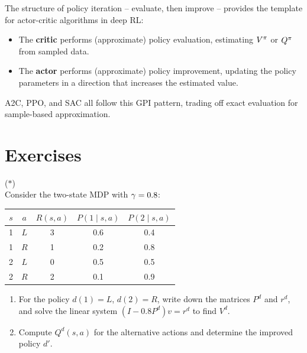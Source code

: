 \documentclass[11pt,a4paper]{article}
\begin{document}
\begin{rlconnection}[title={PI as the Blueprint for Actor-Critic}]
The structure of policy iteration -- evaluate, then improve --
provides the template for actor-critic algorithms in deep RL:
\begin{itemize}[nosep]
    \item The \textbf{critic} performs (approximate) policy
    evaluation, estimating $V^\pi$ or $Q^\pi$ from sampled
    data.
    \item The \textbf{actor} performs (approximate) policy
    improvement, updating the policy parameters in a direction
    that increases the estimated value.
\end{itemize}
A2C, PPO, and SAC all follow this GPI pattern, trading off exact
evaluation for sample-based approximation.
\end{rlconnection}


\section{Exercises}
\label{sec:exercises}

\begin{exercise}
\textnormal{(\(*\))} \\
Consider the two-state MDP with $\gamma = 0.8$:
\begin{center}
\begin{tabular}{ccccc}
\toprule
$s$ & $a$ & $R(s,a)$ & $P(1 \mid s,a)$ & $P(2 \mid s,a)$ \\
\midrule
1 & $L$ & 3 & 0.6 & 0.4 \\
1 & $R$ & 1 & 0.2 & 0.8 \\
2 & $L$ & 0 & 0.5 & 0.5 \\
2 & $R$ & 2 & 0.1 & 0.9 \\
\bottomrule
\end{tabular}
\end{center}
\begin{enumerate}[label=(\alph*)]
    \item For the policy $d(1) = L$, $d(2) = R$, write down the
    matrices $P^d$ and $r^d$, and solve the linear system
    $(I - 0.8 P^d) v = r^d$ to find $V^d$.
    \item Compute $Q^d(s,a)$ for the alternative actions and
    determine the improved policy $d'$.
\end{enumerate}
\end{exercise}
\end{document}

